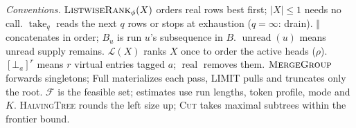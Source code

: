 {\footnotesize\raggedright
\noindent\textit{Conventions.}
$\mbox{\textsc{ListwiseRank}}_\phi(X)$ orders real rows best first; $|X|\le1$ needs no call.
$\operatorname{take}_q$ reads the next $q$ rows or stops at exhaustion ($q=\infty$: drain).
$\Vert$ concatenates in order; $B_u$ is run $u$'s subsequence in $B$.
$\operatorname{unread}(u)$ means unread supply remains.
$\mathcal L(X)$ ranks $X$ once to order the active heads ($\rho$).
$[\bot_a]^r$ means $r$ virtual entries tagged $a$; $\operatorname{real}$ removes them.
$\mbox{\textsc{MergeGroup}}$ forwards singletons; Full materializes each pass, LIMIT pulls and truncates only the root.
$\mathcal F$ is the feasible set; estimates use run lengths, token profile, mode and $K$.
\textsc{HalvingTree} rounds the left size up; \textsc{Cut} takes maximal subtrees within the frontier bound.\par}

